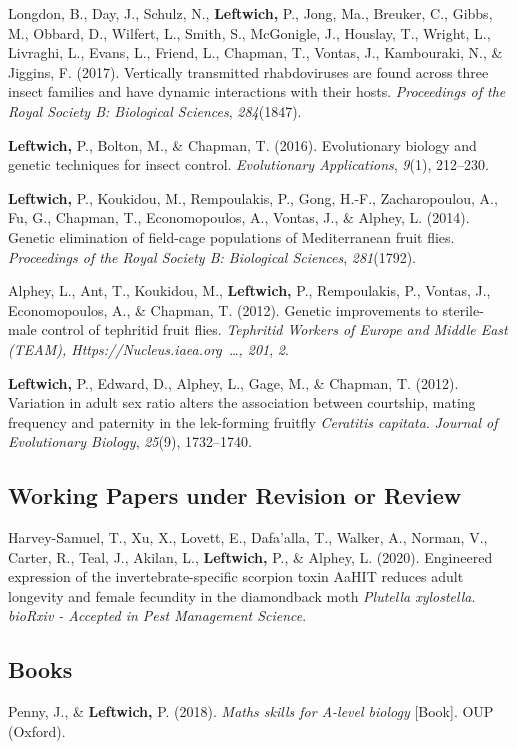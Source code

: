 \documentclass[11pt, a4paper]{awesome-cv}
\begin{document}
\leavevmode\hypertarget{ref-7}{}%
Longdon, B., Day, J., Schulz, N., \textbf{Leftwich,} P., Jong, Ma.,
Breuker, C., Gibbs, M., Obbard, D., Wilfert, L., Smith, S., McGonigle,
J., Houslay, T., Wright, L., Livraghi, L., Evans, L., Friend, L.,
Chapman, T., Vontas, J., Kambouraki, N., \& Jiggins, F. (2017).
Vertically transmitted rhabdoviruses are found across three insect
families and have dynamic interactions with their hosts.
\emph{Proceedings of the Royal Society B: Biological Sciences},
\emph{284}(1847).

\leavevmode\hypertarget{ref-1}{}%
\textbf{Leftwich,} P., Bolton, M., \& Chapman, T. (2016). Evolutionary
biology and genetic techniques for insect control. \emph{Evolutionary
Applications}, \emph{9}(1), 212--230.

\leavevmode\hypertarget{ref-2}{}%
\textbf{Leftwich,} P., Koukidou, M., Rempoulakis, P., Gong, H.-F.,
Zacharopoulou, A., Fu, G., Chapman, T., Economopoulos, A., Vontas, J.,
\& Alphey, L. (2014). Genetic elimination of field-cage populations of
{Mediterranean} fruit flies. \emph{Proceedings of the Royal Society B:
Biological Sciences}, \emph{281}(1792).

\leavevmode\hypertarget{ref-18}{}%
Alphey, L., Ant, T., Koukidou, M., \textbf{Leftwich,} P., Rempoulakis,
P., Vontas, J., Economopoulos, A., \& Chapman, T. (2012). Genetic
improvements to sterile-male control of tephritid fruit flies.
\emph{Tephritid Workers of Europe and Middle East (TEAM),
Https://Nucleus.iaea.org~\ldots, 201}, \emph{2}.

\leavevmode\hypertarget{ref-4}{}%
\textbf{Leftwich,} P., Edward, D., Alphey, L., Gage, M., \& Chapman, T.
(2012). Variation in adult sex ratio alters the association between
courtship, mating frequency and paternity in the lek-forming fruitfly
\emph{{Ceratitis} capitata}. \emph{Journal of Evolutionary Biology},
\emph{25}(9), 1732--1740.

\hypertarget{working-papers-under-revision-or-review}{%
\subsection{Working Papers under Revision or
Review}\label{working-papers-under-revision-or-review}}

\hypertarget{refs_working_paper}{}
\leavevmode\hypertarget{ref-1}{}%
Harvey-Samuel, T., Xu, X., Lovett, E., Dafa'alla, T., Walker, A.,
Norman, V., Carter, R., Teal, J., Akilan, L., \textbf{Leftwich,} P., \&
Alphey, L. (2020). Engineered expression of the invertebrate-specific
scorpion toxin {AaHIT} reduces adult longevity and female fecundity in
the diamondback moth \emph{{Plutella} xylostella}. \emph{bioRxiv -
Accepted in Pest Management Science}.

\hypertarget{books}{%
\subsection{Books}\label{books}}

\hypertarget{refs_proceedings}{}
\leavevmode\hypertarget{ref-1}{}%
Penny, J., \& \textbf{Leftwich,} P. (2018). \emph{Maths skills for
{A-level} biology} {[}Book{]}. OUP (Oxford).
\end{document}
